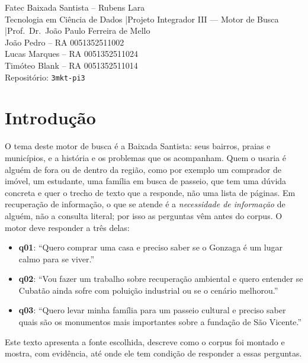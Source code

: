 \documentclass[
  article,
  12pt,
  oneside,
  a4paper,
  english,
  brazil
]{abntex2}
\newcommand{\nomecurso}{Tecnologia em Ciência de Dados}
\newcommand{\nomedisciplina}{Projeto Integrador III --- Motor de Busca}
\newcommand{\nomeprofessor}{Prof.\ Dr.\ João Paulo Ferreira de Mello}
\newcommand{\repositorio}{3mkt-pi3}
\newcommand{\integrantes}{%
  João Pedro -- RA 0051352511002 \\
  Lucas Marques -- RA 0051352511024 \\
  Timóteo Blank -- RA 0051352511014%
}
\begin{document}
\frenchspacing

\maketitle

\begin{center}
  \small
  Fatec Baixada Santista -- Rubens Lara \\
  \nomecurso{} \quad|\quad \nomedisciplina{} \quad|\quad \nomeprofessor{} \\[0.4em]
  \integrantes \\[0.4em]
  Repositório: \texttt{\repositorio}
\end{center}

\textual

\section{Introdução}

O tema deste motor de busca é a Baixada Santista: seus bairros, praias e
municípios, e a história e os problemas que os acompanham. Quem o usaria é
alguém de fora ou de dentro da região, como por exemplo um comprador de imóvel, um estudante,
uma família em busca de passeio, que tem uma dúvida concreta e quer o trecho
de texto que a responde, não uma lista de páginas. Em recuperação de
informação, o que se atende é a \emph{necessidade de informação} de alguém, não
a consulta literal; por isso as perguntas vêm antes
do corpus. O motor deve responder a três delas:

\begin{itemize}\itemsep0pt
  \item \textbf{q01}: ``Quero comprar uma casa e preciso saber se o Gonzaga é um
        lugar calmo para se viver.''
  \item \textbf{q02}: ``Vou fazer um trabalho sobre recuperação ambiental e
        quero entender se Cubatão ainda sofre com poluição industrial ou se o
        cenário melhorou.''
  \item \textbf{q03}: ``Quero levar minha família para um passeio cultural e
        preciso saber quais são os monumentos mais importantes sobre a fundação
        de São Vicente.''
\end{itemize}

Este texto apresenta a fonte escolhida, descreve como o corpus foi montado e
mostra, com evidência, até onde ele tem condição de responder a essas perguntas.
\end{document}
